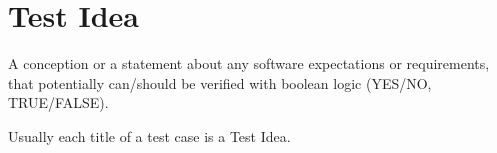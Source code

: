 \section{Test Idea}
\label{sec:Test Idea}

A conception or a statement about any software expectations or requirements, that potentially can/should be verified with boolean logic (YES/NO, TRUE/FALSE).

Usually each title of a test case is a Test Idea.